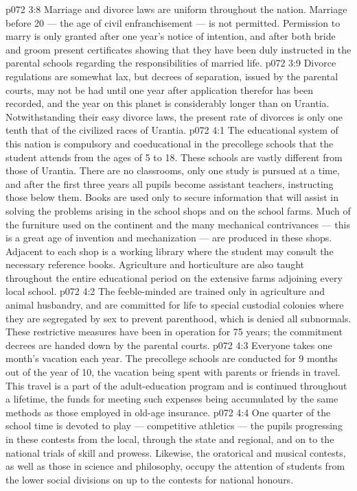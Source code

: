 \vs p072 3:8 Marriage and divorce laws are uniform throughout the nation. Marriage before 20 --- the age of civil enfranchisement --- is not permitted. Permission to marry is only granted after one year’s notice of intention, and after both bride and groom present certificates showing that they have been duly instructed in the parental schools regarding the responsibilities of married life.
\vs p072 3:9 Divorce regulations are somewhat lax, but decrees of separation, issued by the parental courts, may not be had until one year after application therefor has been recorded, and the year on this planet is considerably longer than on Urantia. Notwithstanding their easy divorce laws, the present rate of divorces is only one tenth that of the civilized races of Urantia.
\vs p072 4:1 The educational system of this nation is compulsory and coeducational in the precollege schools that the student attends from the ages of 5 to 18. These schools are vastly different from those of Urantia. There are no classrooms, only one study is pursued at a time, and after the first three years all pupils become assistant teachers, instructing those below them. Books are used only to secure information that will assist in solving the problems arising in the school shops and on the school farms. Much of the furniture used on the continent and the many mechanical contrivances --- this is a great age of invention and mechanization --- are produced in these shops. Adjacent to each shop is a working library where the student may consult the necessary reference books. Agriculture and horticulture are also taught throughout the entire educational period on the extensive farms adjoining every local school.
\vs p072 4:2 \pc The feeble\hyp{}minded are trained only in agriculture and animal husbandry, and are committed for life to special custodial colonies where they are segregated by sex to prevent parenthood, which is denied all subnormals. These restrictive measures have been in operation for 75 years; the commitment decrees are handed down by the parental courts.
\vs p072 4:3 \pc Everyone takes one month’s vacation each year. The precollege schools are conducted for 9 months out of the year of 10, the vacation being spent with parents or friends in travel. This travel is a part of the adult\hyp{}education program and is continued throughout a lifetime, the funds for meeting such expenses being accumulated by the same methods as those employed in old\hyp{}age insurance.
\vs p072 4:4 One quarter of the school time is devoted to play --- competitive athletics --- the pupils progressing in these contests from the local, through the state and regional, and on to the national trials of skill and prowess. Likewise, the oratorical and musical contests, as well as those in science and philosophy, occupy the attention of students from the lower social divisions on up to the contests for national honours.
